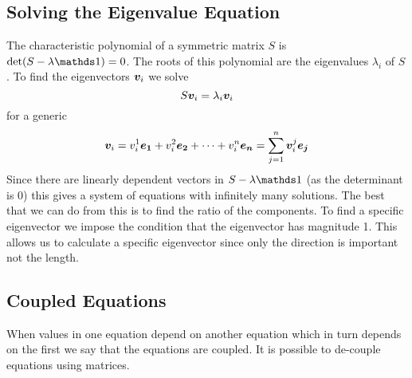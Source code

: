\documentclass{article}
\begin{document}
    \subsection{Solving the Eigenvalue Equation}
    The characteristic polynomial of a symmetric matrix \(S\) is \(\det(S - \lambda\ident) = 0\). 
    The roots of this polynomial are the eigenvalues \(\lambda_i\) of \(S\).
    To find the eigenvectors \(\bm{v}_i\) we solve 
    \[S\bm{v}_i = \lambda_i\bm{v}_i\]
    for a generic 
    \[\bm{v}_i = v_i^1\bm{e_{1}} + v_i^2\bm{e_{2}} + \dotsb + v_i^n\bm{e_{n}} = \sum_{j = 1}^{n}\bm{v}_i^j\bm{e_{j}}\]
    Since there are linearly dependent vectors in \(S - \lambda\ident\) (as the determinant is 0) this gives a system of equations with infinitely many solutions.
    The best that we can do from this is to find the ratio of the components.
    To find a specific eigenvector we impose the condition that the eigenvector has magnitude 1. 
    This allows us to calculate a specific eigenvector since only the direction is important not the length.
    
    \subsection{Coupled Equations}
    When values in one equation depend on another equation which in turn depends on the first we say that the equations are coupled.
    It is possible to de-couple equations using matrices.
    
\end{document}

